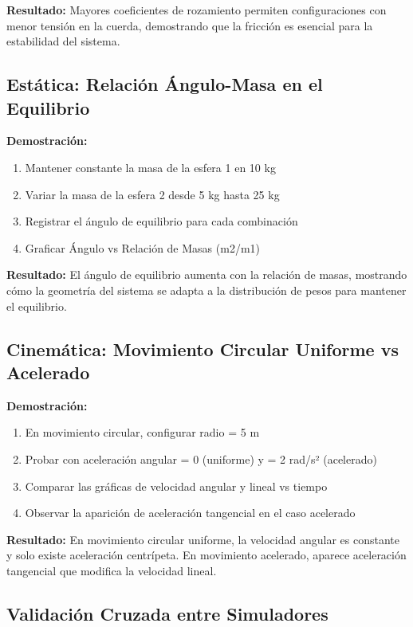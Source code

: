 \textbf{Resultado:} Mayores coeficientes de rozamiento permiten configuraciones con menor tensión en la cuerda, demostrando que la fricción es esencial para la estabilidad del sistema.

\subsection{Estática: Relación Ángulo-Masa en el Equilibrio}

\textbf{Demostración:}
\begin{enumerate}
    \item Mantener constante la masa de la esfera 1 en 10 kg
    \item Variar la masa de la esfera 2 desde 5 kg hasta 25 kg
    \item Registrar el ángulo de equilibrio para cada combinación
    \item Graficar Ángulo vs Relación de Masas (m2/m1)
\end{enumerate}

\textbf{Resultado:} El ángulo de equilibrio aumenta con la relación de masas, mostrando cómo la geometría del sistema se adapta a la distribución de pesos para mantener el equilibrio.

\subsection{Cinemática: Movimiento Circular Uniforme vs Acelerado}

\textbf{Demostración:}
\begin{enumerate}
    \item En movimiento circular, configurar radio = 5 m
    \item Probar con aceleración angular = 0 (uniforme) y = 2 rad/s² (acelerado)
    \item Comparar las gráficas de velocidad angular y lineal vs tiempo
    \item Observar la aparición de aceleración tangencial en el caso acelerado
\end{enumerate}

\textbf{Resultado:} En movimiento circular uniforme, la velocidad angular es constante y solo existe aceleración centrípeta. En movimiento acelerado, aparece aceleración tangencial que modifica la velocidad lineal.

\subsection{Validación Cruzada entre Simuladores}

